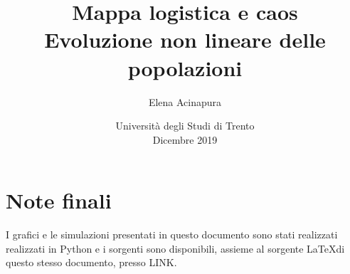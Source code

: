 \documentclass{article}
\title{\textbf{\LARGE Mappa logistica e caos}\\ {\Large Evoluzione non lineare delle popolazioni}}
\author{Elena Acinapura}
\date{{Università degli Studi di Trento} \\{Dicembre 2019}}
\theoremstyle{teorema}
\theoremstyle{definizione}
\begin{document}
\maketitle
\begin{minipage}{\linewidth}
\end{minipage}

\newpage
\tableofcontents
\newpage






\vspace{30pt}

\vspace{30pt}
\section*{Note finali}
I grafici e le simulazioni presentati in questo documento sono stati realizzati realizzati in Python e i sorgenti sono disponibili, assieme al sorgente \LaTeX di questo stesso documento, presso LINK.
\end{document}
